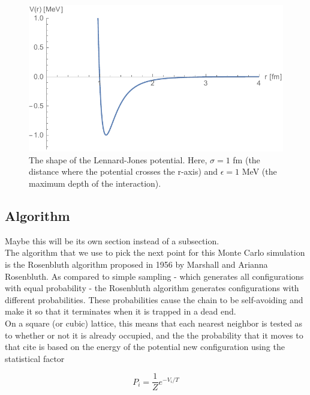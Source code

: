 \documentclass{article}
\begin{document}
\begin{multicols}{2}
\begin{figure}[H]
\begin{center}
\includegraphics[width=\linewidth]{Figures/VLJ.pdf}
\caption{The shape of the Lennard-Jones potential.  Here, $\sigma=1$ fm (the distance where the potential crosses the r-axis) and $\epsilon =1$ MeV (the maximum depth of the interaction).}
\label{VLJfig}
\end{center}
\end{figure}

\subsection{Algorithm}

Maybe this will be its own section instead of a subsection.\\

The algorithm that we use to pick the next point for this Monte Carlo simulation is the Rosenbluth algorithm proposed in 1956 by Marshall and Arianna Rosenbluth.  As compared to simple sampling - which generates all configurations with equal probability - the Rosenbluth algorithm generates configurations with different probabilities.  These probabilities cause the chain to be self-avoiding and make it so that it terminates when it is trapped in a dead end.  \cite{SSRosenbluth} \\

On a square (or cubic) lattice, this means that each nearest neighbor is tested as to whether or not it is already occupied, and the the probability that it moves to that cite is based on the energy of the potential new configuration using the statistical factor

\begin{equation}
\label{prob}
P_i = \frac{1}{Z} e^{-V_i/T}
\end{equation}


\end{multicols}
\end{document}
